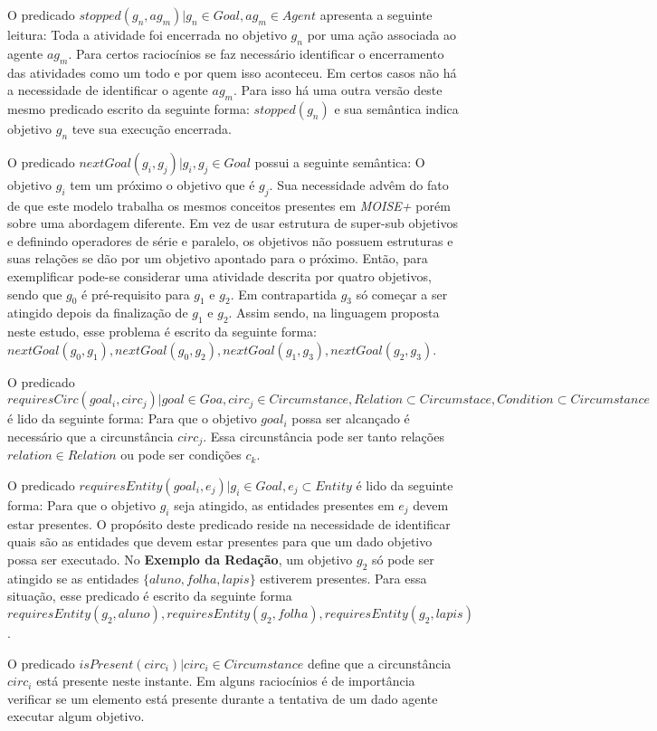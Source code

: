 O predicado $stopped(g_n, ag_m) | g_n \in Goal, ag_m \in Agent$ apresenta a seguinte leitura: Toda a atividade foi encerrada no objetivo $g_n$ por uma ação associada ao agente $ag_m$. Para certos raciocínios se faz necessário identificar o encerramento das atividades como um todo e por quem isso aconteceu. Em certos casos não há a necessidade de identificar o agente $ag_m$. Para isso há uma outra versão deste mesmo predicado escrito da seguinte forma: $stopped(g_n)$ e sua semântica indica objetivo $g_n$ teve sua execução encerrada. 

O predicado $nextGoal(g_i,g_j) |g_i, g_j \in Goal$ possui a seguinte semântica: O objetivo $g_i$ tem um próximo o objetivo que é $g_j$. Sua necessidade advêm do fato de que este modelo trabalha os mesmos conceitos presentes em \textit{MOISE+} porém sobre uma abordagem diferente. Em vez de usar estrutura de super-sub objetivos e definindo operadores de série e paralelo, os objetivos não possuem estruturas e suas relações se dão por um objetivo apontado para o próximo. Então, para exemplificar pode-se considerar uma atividade descrita por quatro objetivos, sendo que $g_0$ é pré-requisito para $g_1$ e $g_2$. Em contrapartida $g_3$ só começar a ser atingido depois da finalização de $g_1$ e $g_2$. Assim sendo, na linguagem proposta neste estudo, esse problema é escrito da seguinte forma: $nextGoal(g_0,g_1), nextGoal(g_0,g_2), nextGoal(g_1,g_3), nextGoal(g_2,g_3)$.

O predicado $requiresCirc(goal_i,circ_j) | goal \in Goa, circ_j \in Circumstance, Relation \subset Circumstace, Condition \subset Circumstance$ é lido da seguinte forma: Para que o objetivo $goal_i$ possa ser alcançado é necessário que a circunstância $circ_j$. Essa circunstância pode ser tanto relações $relation \in Relation$ ou pode ser condições $c_k$.

O predicado $requiresEntity(goal_i, e_j) | g_i \in Goal, e_j \subset Entity $ é lido da seguinte forma: Para que o objetivo $g_i$ seja atingido, as entidades presentes em $e_j$ devem estar presentes. O propósito deste predicado reside na necessidade de identificar quais são as entidades que devem estar presentes para que um dado objetivo possa ser executado. No \textbf{Exemplo da Redação}, um objetivo $g_2$ só pode ser 
atingido se as entidades $\{ aluno, folha, lapis\}$ estiverem presentes. Para essa situação, esse predicado é escrito da seguinte forma $requiresEntity(g_2, aluno), requiresEntity(g_2, folha), requiresEntity(g_2, lapis)$.

O predicado $isPresent(circ_i) | circ_i \in Circumstance $ define que a circunstância $circ_i$ está presente neste instante. Em alguns raciocínios é de importância verificar se um elemento está presente durante a tentativa de um dado agente executar algum objetivo.

